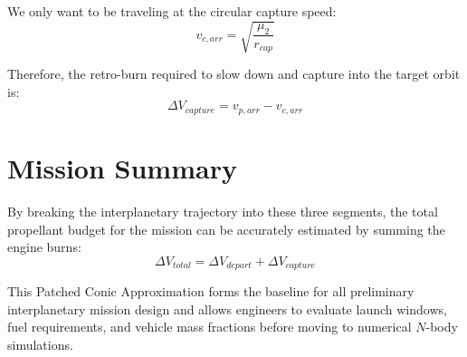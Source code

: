 \documentclass[12pt]{article}
\begin{document}
We only want to be traveling at the circular capture speed:
\begin{equation}
    v_{c, arr} = \sqrt{\frac{\mu_2}{r_{cap}}}
\end{equation}

Therefore, the retro-burn required to slow down and capture into the target orbit is:
\begin{equation}
    \Delta V_{capture} = v_{p, arr} - v_{c, arr}
\end{equation}

\vspace{0.5cm}

\section*{Mission Summary}
By breaking the interplanetary trajectory into these three segments, the total propellant budget for the mission can be accurately estimated by summing the engine burns:
\begin{equation}
    \Delta V_{total} = \Delta V_{depart} + \Delta V_{capture}
\end{equation}

This Patched Conic Approximation forms the baseline for all preliminary interplanetary mission design and allows engineers to evaluate launch windows, fuel requirements, and vehicle mass fractions before moving to numerical $N$-body simulations.
\end{document}
